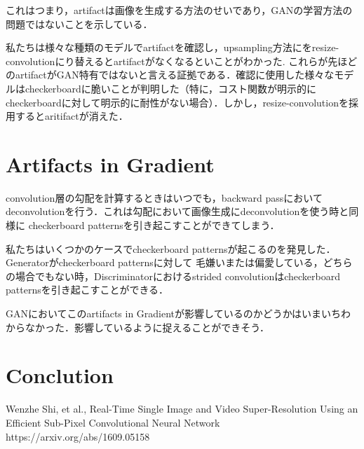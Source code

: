 \documentclass[uplatex, dvipdfmx]{jsarticle}
\theoremstyle{definition}
\begin{document}
    これはつまり，artifactは画像を生成する方法のせいであり，GANの学習方法の問題ではないことを示している．

    私たちは様々な種類のモデルでartifactを確認し，upsampling方法にをresize-convolutionにり替えるとartifactがなくなるといことがわかった.
    これらが先ほどのartifactがGAN特有ではないと言える証拠である．確認に使用した様々なモデルはcheckerboardに脆いことが判明した（特に，コスト関数が明示的に
    checkerboardに対して明示的に耐性がない場合）．しかし，resize-convolutionを採用するとaritifactが消えた．

    \section{Artifacts in Gradient}
    convolution層の勾配を計算するときはいつでも，backward passにおいてdeconvolutionを行う．これは勾配において画像生成にdeconvolutionを使う時と同様に
    checkerboard patternsを引き起こすことができてしまう．

    私たちはいくつかのケースでcheckerboard patternsが起こるのを発見した．Generatorがcheckerboard patternsに対して
    毛嫌いまたは偏愛している，どちらの場合でもない時，Discriminatorにおけるstrided convolutionはcheckerboard patternsを引き起こすことができる．

    GANにおいてこのartifacts in Gradientが影響しているのかどうかはいまいちわからなかった．影響しているように捉えることができそう．

    \section{Conclution}

    \newpage
    \begin{thebibliography}{10}
            Wenzhe Shi, et al., 
            Real-Time Single Image and Video Super-Resolution Using an Efficient Sub-Pixel Convolutional Neural Network \\
            https://arxiv.org/abs/1609.05158
    \end{thebibliography}
    
\end{document}
